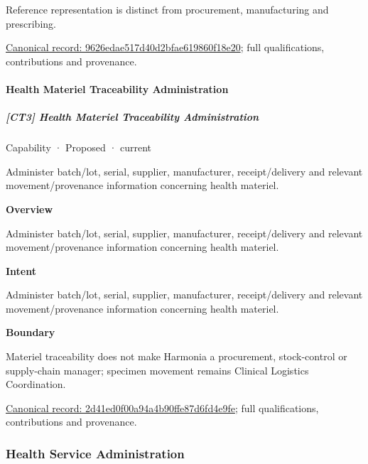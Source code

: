 Reference representation is distinct from procurement, manufacturing and prescribing.


{\footnotesize \href{../../../../continuum/strategy/capability/9626edae517d40d2bfae619860f18e20.md}{Canonical record: 9626edae517d40d2bfae619860f18e20}; full qualifications, contributions and provenance.}\par
\paragraph{Health Materiel Traceability Administration}

\subparagraph{[CT3] Health Materiel Traceability Administration}

\label{element:2d41ed0f00a94a4b90ffe87d6fd4e9fe}
{\small Capability · Proposed · current}\par

Administer batch/lot, serial, supplier, manufacturer, receipt/delivery and relevant movement/provenance information concerning health materiel.



\textbf{Overview}



Administer batch/lot, serial, supplier, manufacturer, receipt/delivery and relevant movement/provenance information concerning health materiel.



\textbf{Intent}



Administer batch/lot, serial, supplier, manufacturer, receipt/delivery and relevant movement/provenance information concerning health materiel.



\textbf{Boundary}



Materiel traceability does not make Harmonia a procurement, stock-control or supply-chain manager; specimen movement remains Clinical Logistics Coordination.


{\footnotesize \href{../../../../continuum/strategy/capability/2d41ed0f00a94a4b90ffe87d6fd4e9fe.md}{Canonical record: 2d41ed0f00a94a4b90ffe87d6fd4e9fe}; full qualifications, contributions and provenance.}\par
\subsubsection{Health Service Administration}

